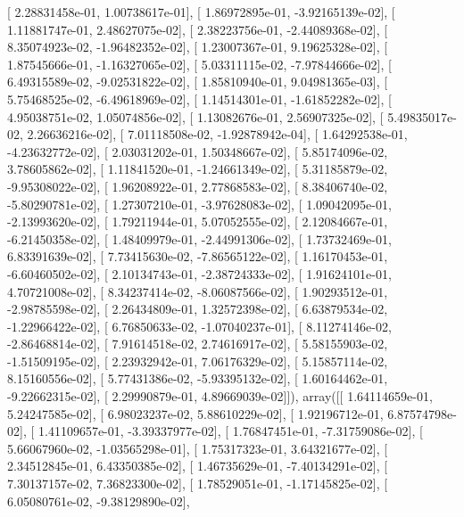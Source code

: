 \documentclass{article}
\begin{document}
       [  2.28831458e-01,   1.00738617e-01],
       [  1.86972895e-01,  -3.92165139e-02],
       [  1.11881747e-01,   2.48627075e-02],
       [  2.38223756e-01,  -2.44089368e-02],
       [  8.35074923e-02,  -1.96482352e-02],
       [  1.23007367e-01,   9.19625328e-02],
       [  1.87545666e-01,  -1.16327065e-02],
       [  5.03311115e-02,  -7.97844666e-02],
       [  6.49315589e-02,  -9.02531822e-02],
       [  1.85810940e-01,   9.04981365e-03],
       [  5.75468525e-02,  -6.49618969e-02],
       [  1.14514301e-01,  -1.61852282e-02],
       [  4.95038751e-02,   1.05074856e-02],
       [  1.13082676e-01,   2.56907325e-02],
       [  5.49835017e-02,   2.26636216e-02],
       [  7.01118508e-02,  -1.92878942e-04],
       [  1.64292538e-01,  -4.23632772e-02],
       [  2.03031202e-01,   1.50348667e-02],
       [  5.85174096e-02,   3.78605862e-02],
       [  1.11841520e-01,  -1.24661349e-02],
       [  5.31185879e-02,  -9.95308022e-02],
       [  1.96208922e-01,   2.77868583e-02],
       [  8.38406740e-02,  -5.80290781e-02],
       [  1.27307210e-01,  -3.97628083e-02],
       [  1.09042095e-01,  -2.13993620e-02],
       [  1.79211944e-01,   5.07052555e-02],
       [  2.12084667e-01,  -6.21450358e-02],
       [  1.48409979e-01,  -2.44991306e-02],
       [  1.73732469e-01,   6.83391639e-02],
       [  7.73415630e-02,  -7.86565122e-02],
       [  1.16170453e-01,  -6.60460502e-02],
       [  2.10134743e-01,  -2.38724333e-02],
       [  1.91624101e-01,   4.70721008e-02],
       [  8.34237414e-02,  -8.06087566e-02],
       [  1.90293512e-01,  -2.98785598e-02],
       [  2.26434809e-01,   1.32572398e-02],
       [  6.63879534e-02,  -1.22966422e-02],
       [  6.76850633e-02,  -1.07040237e-01],
       [  8.11274146e-02,  -2.86468814e-02],
       [  7.91614518e-02,   2.74616917e-02],
       [  5.58155903e-02,  -1.51509195e-02],
       [  2.23932942e-01,   7.06176329e-02],
       [  5.15857114e-02,   8.15160556e-02],
       [  5.77431386e-02,  -5.93395132e-02],
       [  1.60164462e-01,  -9.22662315e-02],
       [  2.29990879e-01,   4.89669039e-02]]), array([[  1.64114659e-01,   5.24247585e-02],
       [  6.98023237e-02,   5.88610229e-02],
       [  1.92196712e-01,   6.87574798e-02],
       [  1.41109657e-01,  -3.39337977e-02],
       [  1.76847451e-01,  -7.31759086e-02],
       [  5.66067960e-02,  -1.03565298e-01],
       [  1.75317323e-01,   3.64321677e-02],
       [  2.34512845e-01,   6.43350385e-02],
       [  1.46735629e-01,  -7.40134291e-02],
       [  7.30137157e-02,   7.36823300e-02],
       [  1.78529051e-01,  -1.17145825e-02],
       [  6.05080761e-02,  -9.38129890e-02],
\end{document}
